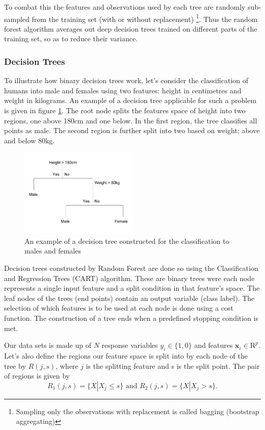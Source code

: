 To combat this the features and observations used by each tree are randomly sub-sampled from the training set (with or without replacement) \footnote{Sampling only the observations with replacement is called bagging (bootstrap aggregating)}. Thus the random forest algorithm averages out deep decision trees trained on different parts of the training set, so as to reduce their variance.  

 \subsubsection{Decision Trees}

To illustrate how binary decision trees work, let's consider the classification of humans into male and females using two features: height in centimetres and weight in kilograms. An example of a decision tree applicable for such a problem is given in figure \ref{fig:extree}. The root node splits the features space of height into two regions, one above 180cm and one below. In the first region, the tree classifies all points as male. The second region is further split into two based on weight; above and below 80kg. 
\begin{figure}
\centering
	\includegraphics[width=0.5\textwidth]{Example-Decision-Tree}
	\caption{An example of a decision tree constructed for the classification to males and females}
	\label{fig:extree}
\end{figure}

Decision trees constructed by Random Forest are done so using the Classification and Regression Trees (CART) algorithm. These are binary trees were each node represents a single input feature and a split condition in that feature's space. The leaf nodes of the trees (end points) contain an output variable (class label). The selection of which features is to be used at each node is done using a cost function. The construction of a tree ends when a predefined stopping condition is met.


Our data sets is made up of $N$ response variables $y_i \in \{1,0\}$ and features $\mathbf{x}_i \in \mathrm{R}^p$. Let's also define the regions our feature space is split into by each node of the tree by $R(j,s)$, where $j$ is the splitting feature and s is the split point. The pair of regions is given by 
\begin{equation}
	R_1(j,s) = \{X|X_j \leq s\} \text{ and } 	R_2(j,s) = \{X|X_j > s\}.  
\end{equation}

